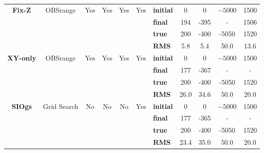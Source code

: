 \begin{table}
{\begin{tabular}{c | c c c c c | l c c c c}
\multirow{4}{*}{\textbf{Fix-Z}} & \multirow{4}{*}{OBSrange} & \multirow{4}{*}{Yes} & \multirow{4}{*}{Yes} & \multirow{4}{*}{Yes} & \multirow{4}{*}{Yes} & \textbf{initial} & 0 & 0 & $\mathit{-5000}$ & 1500 \\ 
\multirow{4}{*}{} & \multirow{4}{*}{} & \multirow{4}{*}{} & \multirow{4}{*}{} & \multirow{4}{*}{} & \multirow{4}{*}{} & \textbf{final}& 194 & -395 & - & 1506 \\ 
\multirow{4}{*}{} & \multirow{4}{*}{} & \multirow{4}{*}{} & \multirow{4}{*}{} & \multirow{4}{*}{} & \multirow{4}{*}{} & \textbf{true}& 200 & -400 & -5050 & 1520 \\ 
\multirow{4}{*}{} & \multirow{4}{*}{} & \multirow{4}{*}{} & \multirow{4}{*}{} & \multirow{4}{*}{} & \multirow{4}{*}{} & \textbf{RMS} & 5.8 & 5.4 & 50.0 & 13.6 \\ 
\hline
\multirow{4}{*}{\textbf{XY-only}} & \multirow{4}{*}{OBSrange} & \multirow{4}{*}{Yes} & \multirow{4}{*}{Yes} & \multirow{4}{*}{Yes} & \multirow{4}{*}{Yes} & \textbf{initial} & 0 & 0 & $\mathit{-5000}$ & $\mathit{1500}$ \\ 
\multirow{4}{*}{} & \multirow{4}{*}{} & \multirow{4}{*}{} & \multirow{4}{*}{} & \multirow{4}{*}{} & \multirow{4}{*}{} & \textbf{final}& 177 & -367 & - & - \\ 
\multirow{4}{*}{} & \multirow{4}{*}{} & \multirow{4}{*}{} & \multirow{4}{*}{} & \multirow{4}{*}{} & \multirow{4}{*}{} & \textbf{true}& 200 & -400 & -5050 & 1520 \\ 
\multirow{4}{*}{} & \multirow{4}{*}{} & \multirow{4}{*}{} & \multirow{4}{*}{} & \multirow{4}{*}{} & \multirow{4}{*}{} & \textbf{RMS} & 26.0 & 34.6 & 50.0 & 20.0 \\ 
\hline
\multirow{4}{*}{\textbf{SIOgs}} & \multirow{4}{*}{Grid Search} & \multirow{4}{*}{No} & \multirow{4}{*}{No} & \multirow{4}{*}{No} & \multirow{4}{*}{Yes} & \textbf{initial} & 0 & 0 & $\mathit{-5000}$ & $\mathit{1500}$ \\ 
\multirow{4}{*}{} & \multirow{4}{*}{} & \multirow{4}{*}{} & \multirow{4}{*}{} & \multirow{4}{*}{} & \multirow{4}{*}{} & \textbf{final}& 177 & -365 & - & - \\ 
\multirow{4}{*}{} & \multirow{4}{*}{} & \multirow{4}{*}{} & \multirow{4}{*}{} & \multirow{4}{*}{} & \multirow{4}{*}{} & \textbf{true}& 200 & -400 & -5050 & 1520 \\ 
\multirow{4}{*}{} & \multirow{4}{*}{} & \multirow{4}{*}{} & \multirow{4}{*}{} & \multirow{4}{*}{} & \multirow{4}{*}{} & \textbf{RMS} & 23.4 & 35.0 & 50.0 & 20.0 \\ 

\end{tabular}}
\end{table}
